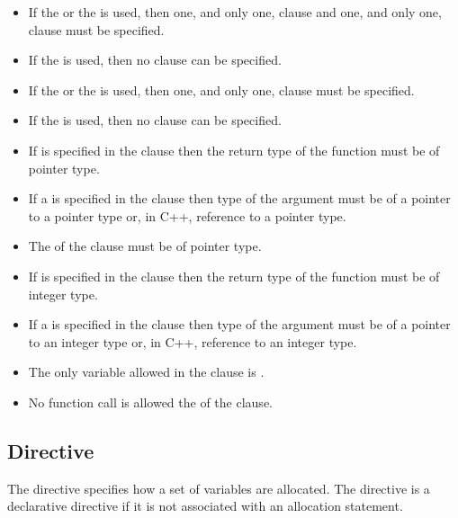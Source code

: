 \begin{ccppspecific}
\restrictions
\begin{itemize}
\item If the   or the   is used, then one, and only one,  clause and one, and only one,  clause must be specified.
\item If the   is used, then no  clause can be specified.
\item If the   or the   is used, then one, and only one,  clause must be specified.
\item If the   is used, then no  clause can be specified.
\item If  is specified in the  clause then the return type of the function must be of pointer type.
\item If a  is specified in the  clause then type of the argument must be of a pointer to a pointer type or, in C++, reference to a pointer type.
\item The  of the  clause must be of pointer type.
\item If  is specified in the  clause then the return type of the function must be of integer type.
\item If a  is specified in the  clause then type of the argument must be of a pointer to an integer type or, in C++, reference to an integer type.
\item The only variable allowed in the  clause is .
\item No function call is allowed the  of the  clause.
\end{itemize}

\end{ccppspecific}

\subsection{ Directive}
\label{subsec:allocate Directive}
\summary
 
The  directive specifies how a set of variables are allocated. The  directive is a declarative directive if it is not associated with an allocation statement.
 

